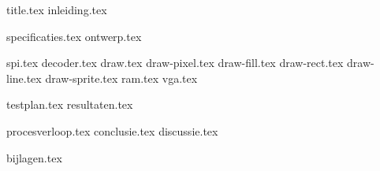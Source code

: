\documentclass[final]{scrreprt}
\begin{document}

{title.tex}
{inleiding.tex}
\newpage

\tableofcontents

\newpage
{}

{specificaties.tex}
{ontwerp.tex}

{spi.tex}
{decoder.tex}
{draw.tex}
{draw-pixel.tex}
{draw-fill.tex}
{draw-rect.tex}
{draw-line.tex}
{draw-sprite.tex}
{ram.tex}
{vga.tex}

{testplan.tex}
{resultaten.tex}

{procesverloop.tex}
{conclusie.tex}
{discussie.tex}

\newpage
{}

\printbibliography
{bijlagen.tex}
\end{document}

